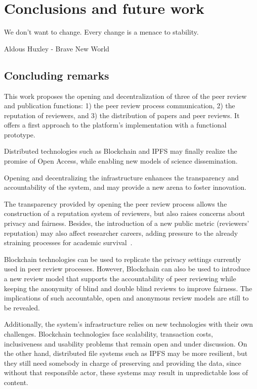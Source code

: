 \chapter{Conclusions and future work}

\begin{FraseCelebre}
  \begin{Frase}
    We don't want to change. Every change is a menace to stability.
  \end{Frase}
  \begin{Fuente}
    Aldous Huxley - Brave New World
  \end{Fuente}
\end{FraseCelebre}

\section{Concluding remarks}

This work proposes the opening and decentralization of three of the peer review
and publication functions: 1) the peer review process communication, 2) the
reputation of reviewers, and 3) the distribution of papers and peer reviews. It
offers a first approach to the platform's implementation with a functional
prototype.

Distributed technologies such as Blockchain and IPFS may finally realize the
promise of Open Access, while enabling new models of science dissemination.

Opening and decentralizing the infrastructure enhances the transparency and
accountability of the system, and may provide a new arena to foster innovation.

The transparency provided by opening the peer review process allows the
construction of a reputation system of reviewers, but also raises concerns about
privacy and fairness. Besides, the introduction of a new public metric
(reviewers' reputation) may also affect researcher careers, adding pressure to
the already straining processes for academic survival~\cite{de2005publish}.

Blockchain technologies can be used to replicate the privacy settings currently
used in peer review processes. However, Blockchain can also be used to introduce
a new review model that supports the accountability of peer reviewing while
keeping the anonymity of blind and double blind reviews to improve fairness. The
implications of such accountable, open and anonymous review models are still to
be revealed.

Additionally, the system's infrastructure relies on new technologies with their
own challenges. Blockchain technologies face scalability, transaction costs,
inclusiveness and usability problems that remain open and under discussion. On
the other hand, distributed file systems such as IPFS may be more resilient, but
they still need somebody in charge of preserving and providing the data, since
without that responsible actor, these systems may result in unpredictable loss
of content.

